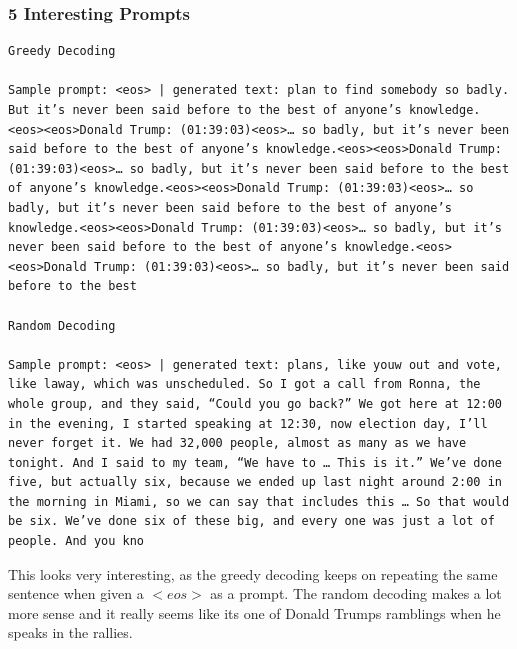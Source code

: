 \documentclass{article}
\begin{document}
\subsubsection{5 Interesting Prompts}
\begin{lstlisting}
Greedy Decoding

Sample prompt: <eos> | generated text: plan to find somebody so badly. But it’s never been said before to the best of anyone’s knowledge.<eos><eos>Donald Trump: (01:39:03)<eos>… so badly, but it’s never been said before to the best of anyone’s knowledge.<eos><eos>Donald Trump: (01:39:03)<eos>… so badly, but it’s never been said before to the best of anyone’s knowledge.<eos><eos>Donald Trump: (01:39:03)<eos>… so badly, but it’s never been said before to the best of anyone’s knowledge.<eos><eos>Donald Trump: (01:39:03)<eos>… so badly, but it’s never been said before to the best of anyone’s knowledge.<eos><eos>Donald Trump: (01:39:03)<eos>… so badly, but it’s never been said before to the best

Random Decoding

Sample prompt: <eos> | generated text: plans, like youw out and vote, like laway, which was unscheduled. So I got a call from Ronna, the whole group, and they said, “Could you go back?” We got here at 12:00 in the evening, I started speaking at 12:30, now election day, I’ll never forget it. We had 32,000 people, almost as many as we have tonight. And I said to my team, “We have to … This is it.” We’ve done five, but actually six, because we ended up last night around 2:00 in the morning in Miami, so we can say that includes this … So that would be six. We’ve done six of these big, and every one was just a lot of people. And you kno
\end{lstlisting}
This looks very interesting, as the greedy decoding keeps on repeating the same sentence when given a $<eos>$ as a prompt. The random decoding makes a lot more sense and it really seems like its one of Donald Trumps ramblings when he speaks in the rallies.
\end{document}
